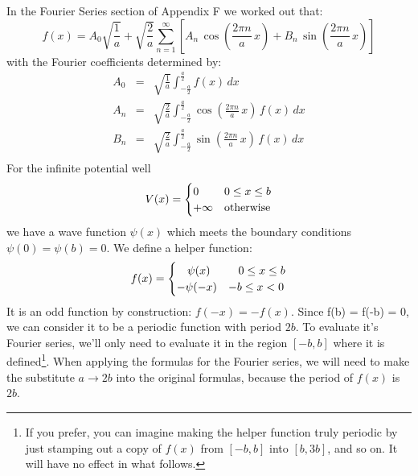 \documentclass[12pt]{book}
\begin{document}
In the Fourier Series section of Appendix F we worked out that:
\begin{equation*}
f(x) = A_0 \sqrt{\frac{1}{a}} + \sqrt{\frac{2}{a}} \sum_{n=1}^{\infty}  \left[ A_n \, \cos\left(\frac{2\pi n}{a} \, x \right) + B_n \, \sin\left(\frac{2\pi n}{a} \, x \right)\right]\end{equation*}
with the Fourier coefficients determined by:
\begin{eqnarray*}
A_0 &=& \sqrt{\frac{1}{a}} \int_{-\frac{a}{2}}^{\frac{a}{2}} f(x) \, dx \\
A_n &=& \sqrt{\frac{2}{a}} \int_{-\frac{a}{2}}^{\frac{a}{2}} 
\cos\left(\frac{2\pi n}{a} \, x \right) \, f(x) \, dx \\
B_n &=& \sqrt{\frac{2}{a}} \int_{-\frac{a}{2}}^{\frac{a}{2}} 
\sin\left(\frac{2\pi n}{a} \, x \right) \, f(x) \, dx \\
\end{eqnarray*}
For the infinite potential well
\begin{equation}
V(x) = 
\begin{cases}    
   0 & 0 \leq x \leq b \\
   +\infty & {\rm otherwise} \\
\end{cases}   
\end{equation}
we have a wave function $\psi(x)$ which meets the boundary conditions $\psi(0) = \psi(b) = 0$.  We define a helper function:
\begin{equation*}
f(x) = 
\begin{cases}    
  \hspace{9.5pt}\psi(x)  & \hspace{9pt} 0 \leq x \leq b \\
  -\psi(-x) & -b \leq x < 0 \\
\end{cases}   
\end{equation*}
It is an odd function by construction:  $f(-x) = -f(x)$.  Since f(b) = f(-b) = 0, we can consider it to be a periodic function with period $2b$. To evaluate it's Fourier series, we'll only need to evaluate it in the region $[-b,b]$ where it is defined\footnote{If you prefer, you can imagine making the helper function truly periodic by just stamping out a copy of $f(x)$ from $[-b,b]$ into $[b,3b]$, and so on.  It will have no effect in what follows.}.  When applying the formulas for the Fourier series, we will need to make the substitute $a \to 2b$ into the original formulas, because the period of $f(x)$ is $2b$.
\end{document}
